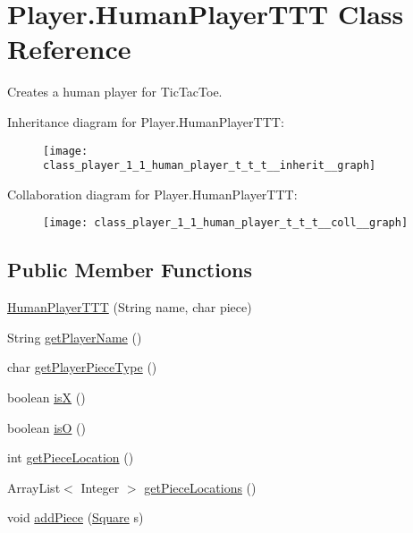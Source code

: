 \hypertarget{class_player_1_1_human_player_t_t_t}{}\section{Player.\+Human\+Player\+T\+T\+T Class Reference}
\label{class_player_1_1_human_player_t_t_t}


Creates a human player for Tic\+Tac\+Toe.  




Inheritance diagram for Player.\+Human\+Player\+T\+T\+T\+:\nopagebreak
\begin{figure}[H]
\begin{center}
\leavevmode
\texttt{[image: class\_player\_1\_1\_human\_player\_t\_t\_t\_\_inherit\_\_graph]}
\end{center}
\end{figure}


Collaboration diagram for Player.\+Human\+Player\+T\+T\+T\+:\nopagebreak
\begin{figure}[H]
\begin{center}
\leavevmode
\texttt{[image: class\_player\_1\_1\_human\_player\_t\_t\_t\_\_coll\_\_graph]}
\end{center}
\end{figure}
\subsection*{Public Member Functions}
\begin{DoxyCompactItemize}
\item 
\hyperlink{class_player_1_1_human_player_t_t_t_a617376ebf70bbb54f6ac722b1e9282a7}{Human\+Player\+T\+T\+T} (String name, char piece)
\item 
String \hyperlink{class_player_1_1_human_player_t_t_t_aadf14d433f944233d05f88cafb5e6a94}{get\+Player\+Name} ()
\item 
char \hyperlink{class_player_1_1_human_player_t_t_t_a3b80370f155683b77911850cc016e6a7}{get\+Player\+Piece\+Type} ()
\item 
boolean \hyperlink{class_player_1_1_human_player_t_t_t_a9c97f1c97829c9af212b8088e80ec7db}{is\+X} ()
\item 
boolean \hyperlink{class_player_1_1_human_player_t_t_t_acce1adf858320b165c07b8250b865edb}{is\+O} ()
\item 
int \hyperlink{class_player_1_1_human_player_t_t_t_a50f86fdac0e60ab7302f99f1ad25953b}{get\+Piece\+Location} ()
\item 
Array\+List$<$ Integer $>$ \hyperlink{class_player_1_1_human_player_t_t_t_accd55d5ba0f1bfc95ff64c3b15c57840}{get\+Piece\+Locations} ()
\item 
void \hyperlink{class_player_1_1_human_player_t_t_t_ab65859ad968e025536e8434efad24a6a}{add\+Piece} (\hyperlink{class_square_1_1_square}{Square} s)
\end{DoxyCompactItemize}
